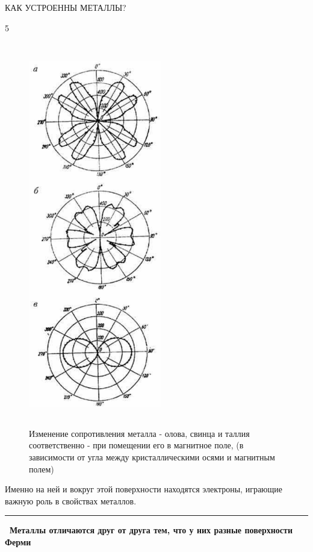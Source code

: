     \centerline{        КАК УСТРОЕННЫ МЕТАЛЛЫ?}
    \begin{flushright}5\end{flushright}
    \begin{paracol}{2}
        \begin{figure}[h]
        \includegraphics[width=5.8cm, height=16.8cm]{image.png}
        \caption{Изменение сопротивления металла - олова, свинца и таллия соответственно - при помещении его в магнитное поле, (в зависимости от угла между кристаллическими осями и магнитным полем)}
        \end{figure}
        {\fontsize{8}{12}\selectfont
        Именно на ней и вокруг этой поверхности находятся электроны, играющие важную роль в свойствах металлов.
        }\\
        \noindent\rule{\columnwidth}{1pt}
        \textbf{\fontsize{13}{2}\selectfont\ Металлы отличаются друг от друга тем, что у них разные поверхности Ферми}\\

\end{paracol}
